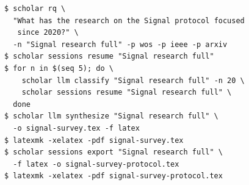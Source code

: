 \begin{frame}[fragile]
  \begin{verbatim}
$ scholar rq \
  "What has the research on the Signal protocol focused
   since 2020?" \
  -n "Signal research full" -p wos -p ieee -p arxiv
$ scholar sessions resume "Signal research full"
$ for n in $(seq 5); do \
    scholar llm classify "Signal research full" -n 20 \
    scholar sessions resume "Signal research full" \
  done
$ scholar llm synthesize "Signal research full" \
  -o signal-survey.tex -f latex
$ latexmk -xelatex -pdf signal-survey.tex
$ scholar sessions export "Signal research full" \
  -f latex -o signal-survey-protocol.tex
$ latexmk -xelatex -pdf signal-survey-protocol.tex
  \end{verbatim}
\end{frame}
